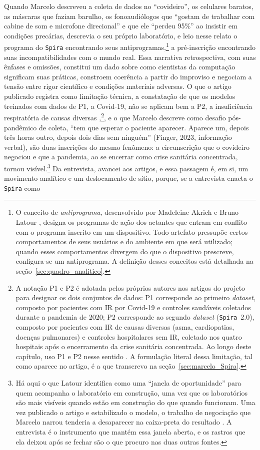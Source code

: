 Quando Marcelo descreveu a coleta de dados no \enquote{covideiro}, os celulares baratos, as máscaras que faziam barulho, os fonoaudiólogos que \enquote{gostam de trabalhar com cabine de som e microfone direcional} e que ele \enquote{perdeu 95\%} ao insistir em condições precárias, descrevia o seu próprio laboratório, e leio nesse relato o programa do \texttt{Spira} encontrando seus antiprogramas,\footnote{O conceito de \textit{antiprograma}, desenvolvido por Madeleine Akrich e Bruno Latour \parencite{AkrichLatour1992Convenient}, designa os programas de ação dos actantes que entram em conflito com o programa inscrito em um dispositivo. Todo artefato pressupõe certos comportamentos de seus usuários e do ambiente em que será utilizado; quando esses comportamentos divergem do que o dispositivo prescreve, configura-se um antiprograma. A definição desses conceitos está detalhada na seção~\ref{sec:quadro_analitico}.} a pré-inscrição encontrando suas incompatibilidades com o mundo real. Essa narrativa retrospectiva, com suas ênfases e omissões, constitui um dado sobre como cientistas da computação significam suas práticas, constroem coerência a partir do improviso e negociam a tensão entre rigor científico e condições materiais adversas. O que o artigo publicado registra como limitação técnica, a constatação de que os modelos treinados com dados de P1, a Covid-19, não se aplicam bem a P2, a insuficiência respiratória de causas diversas \parencite{Gauy2024Discriminant},\footnote{A notação P1 e P2 é adotada pelos próprios autores nos artigos do projeto para designar os dois conjuntos de dados: P1 corresponde ao primeiro \textit{dataset}, composto por pacientes com IR por Covid-19 e controles saudáveis coletados durante a pandemia de 2020; P2 corresponde ao segundo \textit{dataset} (\texttt{Spira}~2.0), composto por pacientes com IR de causas diversas (asma, cardiopatias, doenças pulmonares) e controles hospitalares sem IR, coletado nos quatro hospitais após o encerramento da crise sanitária concentrada. Ao longo deste capítulo, uso P1 e P2 nesse sentido \parencite{Gauy2024Discriminant}. A formulação literal dessa limitação, tal como aparece no artigo, é a que transcrevo na seção~\ref{sec:marcelo_Spira}.}, e o que Marcelo descreve como desafio pós-pandêmico de coleta, \enquote{tem que esperar o paciente aparecer. Aparece um, depois três horas outro, depois dois dias sem ninguém} (Finger, 2023, informação verbal), são duas inscrições do mesmo fenômeno: a circunscrição que o covideiro negociou e que a pandemia, ao se encerrar como crise sanitária concentrada, tornou visível.\footnote{Há aqui o que Latour identifica como uma \enquote{janela de oportunidade} para quem acompanha o laboratório em construção, uma vez que os laboratórios são mais visíveis quando estão em construção do que quando funcionam. Uma vez publicado o artigo e estabilizado o modelo, o trabalho de negociação que Marcelo narrou tenderia a desaparecer na caixa-preta do resultado \parencite{Latour2011CienciaEmAcao}. A entrevista é o instrumento que mantém essa janela aberta, e os rastros que ela deixou após se fechar são o que procuro nas duas outras fontes.} Da entrevista, avancei aos artigos, e essa passagem é, em si, um movimento analítico e um deslocamento de sítio, porque, se a entrevista enacta o \texttt{Spira} como 